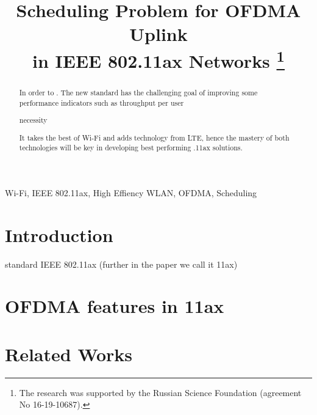 
%


\IEEEoverridecommandlockouts

\title{%
Scheduling Problem for OFDMA Uplink \\in IEEE 802.11ax Networks
\thanks{The research was supported by the Russian Science Foundation (agreement No 16-19-10687).}}

\author{
}

\maketitle

\begin{abstract}
In order to . The new standard has the challenging goal of improving some performance indicators such as throughput per user

necessity

It takes the best of Wi-Fi and adds technology from LTE, hence the mastery of both technologies will be key in developing best performing .11ax solutions.
	
\end{abstract}

\begin{IEEEkeywords}
	Wi-Fi, IEEE 802.11ax, High Effiency WLAN, OFDMA, Scheduling
\end{IEEEkeywords}

\section{Introduction}

standard IEEE 802.11ax (further in the paper we call it 11ax)

\section{OFDMA features in 11ax}

\section{Related Works}

